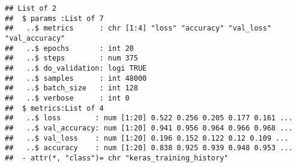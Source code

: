 \documentclass[]{article}
\newenvironment{Shaded}{\begin{snugshade}}{\end{snugshade}}
\newcommand{\DataTypeTok}[1]{\textcolor[rgb]{0.13,0.29,0.53}{#1}}
\newcommand{\DecValTok}[1]{\textcolor[rgb]{0.00,0.00,0.81}{#1}}
\newcommand{\FloatTok}[1]{\textcolor[rgb]{0.00,0.00,0.81}{#1}}
\newcommand{\KeywordTok}[1]{\textcolor[rgb]{0.13,0.29,0.53}{\textbf{#1}}}
\newcommand{\NormalTok}[1]{#1}
\newcommand{\OperatorTok}[1]{\textcolor[rgb]{0.81,0.36,0.00}{\textbf{#1}}}
\newcommand{\StringTok}[1]{\textcolor[rgb]{0.31,0.60,0.02}{#1}}
\begin{document}
\begin{Shaded}
\end{Shaded}

\begin{verbatim}
## List of 2
##  $ params :List of 7
##   ..$ metrics      : chr [1:4] "loss" "accuracy" "val_loss" "val_accuracy"
##   ..$ epochs       : int 20
##   ..$ steps        : num 375
##   ..$ do_validation: logi TRUE
##   ..$ samples      : int 48000
##   ..$ batch_size   : int 128
##   ..$ verbose      : int 0
##  $ metrics:List of 4
##   ..$ loss        : num [1:20] 0.522 0.256 0.205 0.177 0.161 ...
##   ..$ val_accuracy: num [1:20] 0.941 0.956 0.964 0.966 0.968 ...
##   ..$ val_loss    : num [1:20] 0.196 0.152 0.122 0.12 0.109 ...
##   ..$ accuracy    : num [1:20] 0.838 0.925 0.939 0.948 0.953 ...
##  - attr(*, "class")= chr "keras_training_history"
\end{verbatim}
\end{document}
